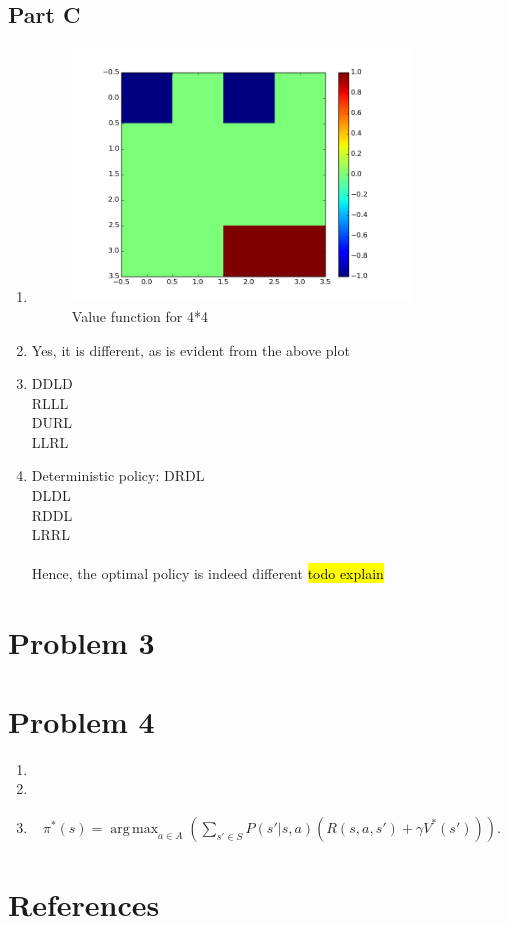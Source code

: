 \documentclass{article}
\DeclareMathOperator*{\argmax}{arg\,max}
\begin{document}
\subsection{Part C}
\begin{enumerate}[label=(\alph*)]

\item 
\begin{figure}[H]
\centering
\includegraphics[width=90mm]{4_4_neg_val_iter.png}
\caption{Value function for 4*4 \label{overflow}}
\end{figure}


\item
Yes, it is different, as is evident from the above plot

\item
DDLD\\
RLLL\\
DURL\\
LLRL\\

\item
Deterministic policy:
DRDL\\
DLDL\\
RDDL\\
LRRL\\\\
Hence, the optimal policy is indeed different
\hl{todo explain}

\end{enumerate}

\section{Problem 3}

\section{Problem 4}
\begin{enumerate}[label=(\alph*)]
\item
\item
\item \begin{align*}
  \pi ^*(s) = \argmax _{a \in A} 
    \left(
      \sum _{s' \in S} 
        P(s' | s, a) \left(
          R (s, a, s') + \gamma V ^*( s' )
        \right)
    \right) .
\end{align*}
\end{enumerate}



\section*{References}
\small
\end{document}
